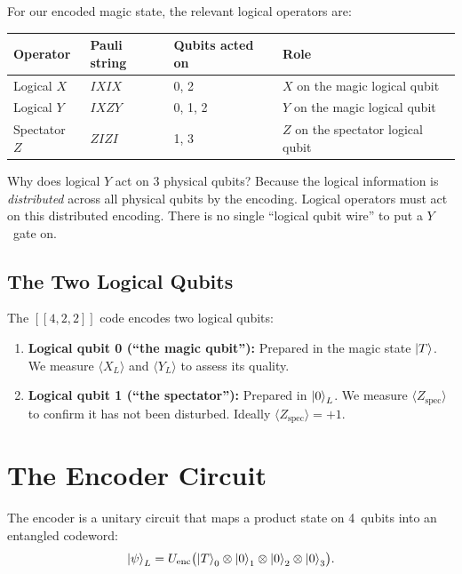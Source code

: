 \documentclass[11pt,a4paper,twoside]{report}
\theoremstyle{definition}
\newcommand{\expect}[1]{\langle #1 \rangle}
\newcommand{\ketT}{\ket{T}}
\begin{document}
For our encoded magic state, the relevant logical operators are:

\begin{center}
\renewcommand{\arraystretch}{1.3}
\begin{tabular}{llll}
\toprule
\textbf{Operator} & \textbf{Pauli string} & \textbf{Qubits acted on} & \textbf{Role} \\
\midrule
Logical $X$ & $IXIX$ & 0, 2 & $X$ on the magic logical qubit \\
Logical $Y$ & $IXZY$ & 0, 1, 2 & $Y$ on the magic logical qubit \\
Spectator $Z$ & $ZIZI$ & 1, 3 & $Z$ on the spectator logical qubit \\
\bottomrule
\end{tabular}
\end{center}

\begin{intuition}
Why does logical $Y$ act on 3 physical qubits? Because the logical
information is \emph{distributed} across all physical qubits by the
encoding. Logical operators must act on this distributed encoding.
There is no single ``logical qubit wire'' to put a $Y$~gate on.
\end{intuition}

\subsection{The Two Logical Qubits}

The $[\![4,2,2]\!]$ code encodes two logical qubits:
\begin{enumerate}
  \item \textbf{Logical qubit 0 (``the magic qubit''):} Prepared in the
        magic state $\ketT$. We measure $\expect{X_L}$ and $\expect{Y_L}$
        to assess its quality.
  \item \textbf{Logical qubit 1 (``the spectator''):} Prepared in
        $\ket{0}_L$. We measure $\expect{Z_{\text{spec}}}$ to confirm it
        has not been disturbed. Ideally $\expect{Z_{\text{spec}}} = +1$.
\end{enumerate}

\section{The Encoder Circuit}
\label{sec:encoder}

The encoder is a unitary circuit that maps a product state on 4~qubits
into an entangled codeword:
\begin{equation}
  \ket{\psi}_L = U_{\text{enc}} \bigl(\ket{T}_0 \otimes \ket{0}_1
  \otimes \ket{0}_2 \otimes \ket{0}_3\bigr).
\end{equation}
\end{document}
